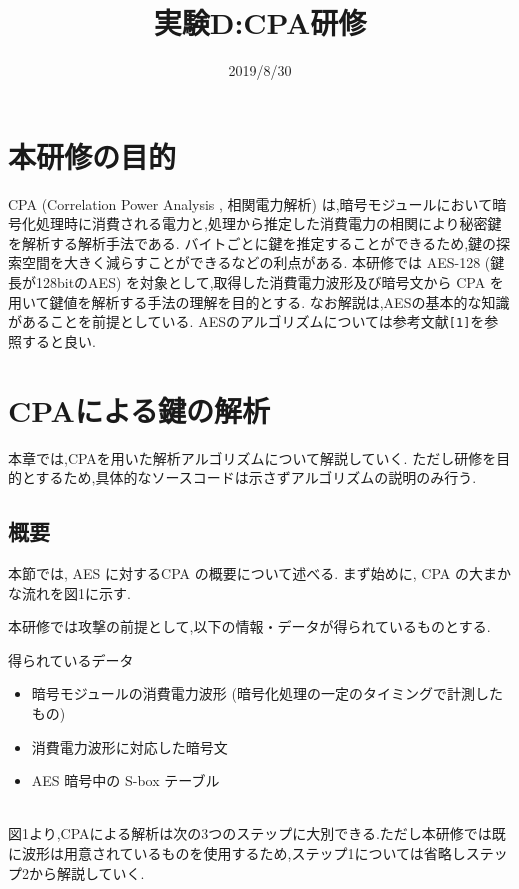 \documentclass[11pt]{jarticle}
\title{実験D:CPA研修}
\author{}
\date{2019/8/30}
\begin{document}
\maketitle
\section{本研修の目的}
CPA (Correlation Power Analysis , 相関電力解析) は,暗号モジュールにおいて暗号化処理時に消費される電力と,処理から推定した消費電力の相関により秘密鍵を解析する解析手法である.
バイトごとに鍵を推定することができるため,鍵の探索空間を大きく減らすことができるなどの利点がある.
本研修では AES-128 (鍵長が128bitのAES) を対象として,取得した消費電力波形及び暗号文から CPA を用いて鍵値を解析する手法の理解を目的とする.
なお解説は,AESの基本的な知識があることを前提としている.
AESのアルゴリズムについては参考文献\verb|[1]|を参照すると良い.

\section{CPAによる鍵の解析}
本章では,CPAを用いた解析アルゴリズムについて解説していく.
ただし研修を目的とするため,具体的なソースコードは示さずアルゴリズムの説明のみ行う.

\subsection{概要}
本節では, AES に対するCPA の概要について述べる.
まず始めに, CPA の大まかな流れを図1に示す.

本研修では攻撃の前提として,以下の情報・データが得られているものとする.\\

\begin{itembox}[l]{得られているデータ}
\begin{itemize}
\item 暗号モジュールの消費電力波形 (暗号化処理の一定のタイミングで計測したもの)
\item 消費電力波形に対応した暗号文
\item AES 暗号中の S-box テーブル
\end{itemize}
\end{itembox} \\

図1より,CPAによる解析は次の3つのステップに大別できる.ただし本研修では既に波形は用意されているものを使用するため,ステップ1については省略しステップ2から解説していく.\\
\end{document}
